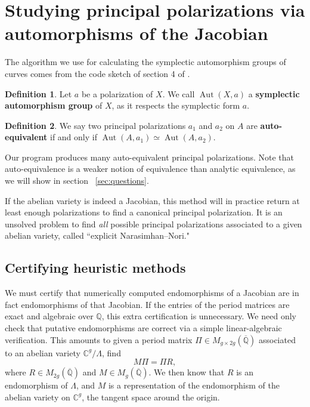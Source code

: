 \documentclass[12pt,reqno]{amsart}
\DeclareMathOperator{\Aut}{Aut}
\newcommand{\C}{\mathbb{C}}
\newcommand{\Q}{\mathbb{Q}}
\theoremstyle{definition}
\newtheorem{defn}{Definition}
\theoremstyle{remark}
\begin{document}
\section{Studying principal polarizations via automorphisms of the Jacobian}

The algorithm we use for calculating the symplectic automorphism groups of curves comes from the code sketch of section 4 of \cite{numerical}. 

\begin{defn} Let $a$ be a polarization of $X$. We call $\Aut(X, a)$ a \textbf{symplectic automorphism group} of $X$, as it respects the symplectic form $a$. 
\end{defn}

\begin{defn} We say two principal polarizations $a_1$ and $a_2$ on $A$ are \textbf{auto-equivalent} if and only if $\Aut(A, a_1) \simeq \Aut(A, a_2)$. \end{defn}

Our program produces many auto-equivalent principal polarizations.  Note that auto-equivalence is a weaker notion of equivalence than analytic equivalence, as we will show in section ~\ref{sec:questions}. 

If the abelian variety is indeed a Jacobian, this method will in practice return at least enough polarizations to find a canonical principal polarization. It is an unsolved problem to find \textit{all} possible principal polarizations associated to a given abelian variety, called ``explicit Narasimhan--Nori."

\subsection{Certifying heuristic methods}
\label{sec:cert}

We must certify that numerically computed endomorphisms of a Jacobian are in fact endomorphisms of that Jacobian. If the entries of the period matrices are exact and algebraic over $\Q$, this extra certification is unnecessary. We need only check that putative endomorphisms are correct via a simple linear-algebraic verification. This amounts to given a period matrix $\Pi \in M_{g \times 2g}(\overline{\Q})$ associated to an abelian variety $\C^g/\Lambda$, find
$$M \Pi = \Pi R,$$
where $R \in  M_{2g}(\overline{\Q})$ and $M \in M_{g}(\overline{\Q})$. We then know that $R$ is an endomorphism of $\Lambda$, and $M$ is a representation of the endomorphism of the abelian variety on $\C^g$, the tangent space around the origin.
\end{document}
